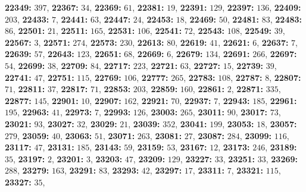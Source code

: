 \textsf{\bfseries 22349:} $397$, \textsf{\bfseries 22367:} $34$, \textsf{\bfseries 22369:} $61$, \textsf{\bfseries 22381:} $19$, \textsf{\bfseries 22391:} $129$, \textsf{\bfseries 22397:} $136$, \textsf{\bfseries 22409:} $203$, \textsf{\bfseries 22433:} $7$, \textsf{\bfseries 22441:} $63$, \textsf{\bfseries 22447:} $24$, \textsf{\bfseries 22453:} $18$, \textsf{\bfseries 22469:} $50$, \textsf{\bfseries 22481:} $83$, \textsf{\bfseries 22483:} $86$, \textsf{\bfseries 22501:} $21$, \textsf{\bfseries 22511:} $165$, \textsf{\bfseries 22531:} $106$, \textsf{\bfseries 22541:} $72$, \textsf{\bfseries 22543:} $108$, \textsf{\bfseries 22549:} $39$, \textsf{\bfseries 22567:} $3$, \textsf{\bfseries 22571:} $274$, \textsf{\bfseries 22573:} $230$, \textsf{\bfseries 22613:} $80$, \textsf{\bfseries 22619:} $41$, \textsf{\bfseries 22621:} $6$, \textsf{\bfseries 22637:} $7$, \textsf{\bfseries 22639:} $57$, \textsf{\bfseries 22643:} $123$, \textsf{\bfseries 22651:} $68$, \textsf{\bfseries 22669:} $6$, \textsf{\bfseries 22679:} $134$, \textsf{\bfseries 22691:} $266$, \textsf{\bfseries 22697:} $54$, \textsf{\bfseries 22699:} $38$, \textsf{\bfseries 22709:} $84$, \textsf{\bfseries 22717:} $223$, \textsf{\bfseries 22721:} $63$, \textsf{\bfseries 22727:} $15$, \textsf{\bfseries 22739:} $39$, \textsf{\bfseries 22741:} $47$, \textsf{\bfseries 22751:} $115$, \textsf{\bfseries 22769:} $106$, \textsf{\bfseries 22777:} $265$, \textsf{\bfseries 22783:} $108$, \textsf{\bfseries 22787:} $8$, \textsf{\bfseries 22807:} $71$, \textsf{\bfseries 22811:} $37$, \textsf{\bfseries 22817:} $71$, \textsf{\bfseries 22853:} $203$, \textsf{\bfseries 22859:} $160$, \textsf{\bfseries 22861:} $2$, \textsf{\bfseries 22871:} $335$, \textsf{\bfseries 22877:} $145$, \textsf{\bfseries 22901:} $10$, \textsf{\bfseries 22907:} $162$, \textsf{\bfseries 22921:} $70$, \textsf{\bfseries 22937:} $7$, \textsf{\bfseries 22943:} $185$, \textsf{\bfseries 22961:} $195$, \textsf{\bfseries 22963:} $41$, \textsf{\bfseries 22973:} $7$, \textsf{\bfseries 22993:} $126$, \textsf{\bfseries 23003:} $265$, \textsf{\bfseries 23011:} $90$, \textsf{\bfseries 23017:} $73$, \textsf{\bfseries 23021:} $93$, \textsf{\bfseries 23027:} $32$, \textsf{\bfseries 23029:} $21$, \textsf{\bfseries 23039:} $352$, \textsf{\bfseries 23041:} $199$, \textsf{\bfseries 23053:} $18$, \textsf{\bfseries 23057:} $279$, \textsf{\bfseries 23059:} $40$, \textsf{\bfseries 23063:} $51$, \textsf{\bfseries 23071:} $263$, \textsf{\bfseries 23081:} $27$, \textsf{\bfseries 23087:} $284$, \textsf{\bfseries 23099:} $116$, \textsf{\bfseries 23117:} $47$, \textsf{\bfseries 23131:} $185$, \textsf{\bfseries 23143:} $59$, \textsf{\bfseries 23159:} $53$, \textsf{\bfseries 23167:} $12$, \textsf{\bfseries 23173:} $246$, \textsf{\bfseries 23189:} $35$, \textsf{\bfseries 23197:} $2$, \textsf{\bfseries 23201:} $3$, \textsf{\bfseries 23203:} $47$, \textsf{\bfseries 23209:} $129$, \textsf{\bfseries 23227:} $33$, \textsf{\bfseries 23251:} $33$, \textsf{\bfseries 23269:} $288$, \textsf{\bfseries 23279:} $163$, \textsf{\bfseries 23291:} $83$, \textsf{\bfseries 23293:} $42$, \textsf{\bfseries 23297:} $17$, \textsf{\bfseries 23311:} $7$, \textsf{\bfseries 23321:} $115$, \textsf{\bfseries 23327:} $35$, 
